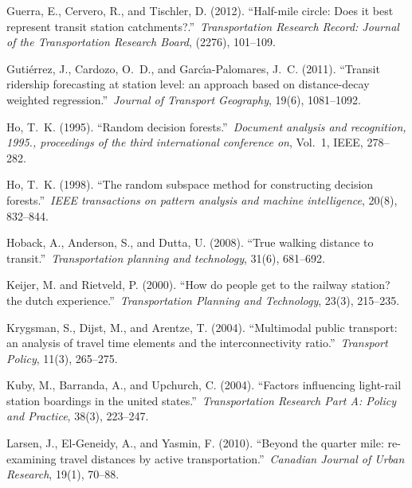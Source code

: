 \documentclass[sustainability,article,submit,moreauthors,pdftex,10pt,a4paper]{Definitions/mdpi}
\begin{document}
\begin{thebibliography}{999}
	Guerra, E., Cervero, R., and Tischler, D. (2012).
	\newblock ``Half-mile circle: Does it best represent transit station
	catchments?.''\ {\em Transportation Research Record: Journal of the
		Transportation Research Board}, (2276), 101--109.
	
	Guti{\'e}rrez, J., Cardozo, O.~D., and Garc{\'\i}a-Palomares, J.~C. (2011).
	\newblock ``Transit ridership forecasting at station level: an approach based
	on distance-decay weighted regression.''\ {\em Journal of Transport
		Geography}, 19(6), 1081--1092.
	
	Ho, T.~K. (1995).
	\newblock ``Random decision forests.''\ {\em Document analysis and recognition,
		1995., proceedings of the third international conference on}, Vol.~1, IEEE,
	278--282.
	
	Ho, T.~K. (1998).
	\newblock ``The random subspace method for constructing decision forests.''\
	{\em IEEE transactions on pattern analysis and machine intelligence}, 20(8),
	832--844.
	
	Hoback, A., Anderson, S., and Dutta, U. (2008).
	\newblock ``True walking distance to transit.''\ {\em Transportation planning
		and technology}, 31(6), 681--692.
	
	Keijer, M. and Rietveld, P. (2000).
	\newblock ``How do people get to the railway station? the dutch experience.''\
	{\em Transportation Planning and Technology}, 23(3), 215--235.
	
	Krygsman, S., Dijst, M., and Arentze, T. (2004).
	\newblock ``Multimodal public transport: an analysis of travel time elements
	and the interconnectivity ratio.''\ {\em Transport Policy}, 11(3), 265--275.
	
	\bibitem[\protect\citeauthoryear{}{Kuby et~al.\@}{2004}]{kuby2004factors}
	Kuby, M., Barranda, A., and Upchurch, C. (2004).
	\newblock ``Factors influencing light-rail station boardings in the united
	states.''\ {\em Transportation Research Part A: Policy and Practice}, 38(3),
	223--247.
	
	Larsen, J., El-Geneidy, A., and Yasmin, F. (2010).
	\newblock ``Beyond the quarter mile: re-examining travel distances by active
	transportation.''\ {\em Canadian Journal of Urban Research}, 19(1), 70--88.
	

\end{thebibliography}
\end{document}
